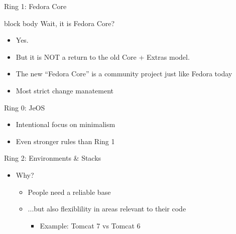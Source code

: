 \documentclass{beamer}
\begin{document}
\begin{frame}{Ring 1: Fedora Core}
  \begin{beamercolorbox}[center,ht=2ex,dp=0.5ex,rounded=true]{block body}
    {\centering Wait, it is Fedora Core?}
  \end{beamercolorbox}
  \begin{itemize}
    \item Yes.
    \item But it is \alert{NOT} a return to the old Core + Extras model.
    \item The new ``Fedora Core'' is a community project just like Fedora today
    \item Most strict change manatement
  \end{itemize}

\end{frame}

\begin{frame}{Ring 0: JeOS}
  \begin{itemize}
    \item Intentional focus on minimalism
    \item Even stronger rules than Ring 1
  \end{itemize}

\end{frame}

\begin{frame}{Ring 2: Environments \& Stacks}
  \begin{itemize}
    \item Why?
    \begin{itemize}
      \item People need a reliable base
      \item ...but also flexiblility in areas relevant to their code
      \begin{itemize}
        \item Example: Tomcat 7 vs Tomcat 6
      \end{itemize}
    \end{itemize}
  \end{itemize}
\end{frame}
\end{document}
